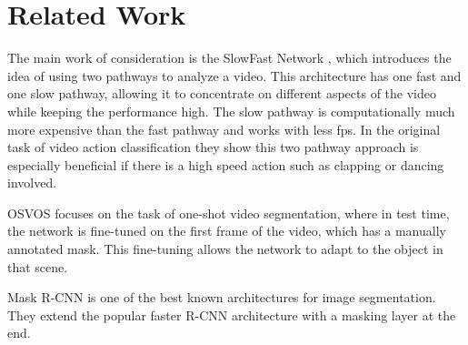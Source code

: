 \section{Related Work}
The main work of consideration is the SlowFast Network \cite{slow_fast}, which introduces the idea of using two pathways to analyze a video. This architecture has one fast and one slow pathway, allowing it to concentrate on different aspects of the video while keeping the performance high. The slow pathway is computationally much more expensive than the fast pathway and works with less fps. In the original task of video action classification they show this two pathway approach is especially beneficial if there is a high speed action such as clapping or dancing involved.

OSVOS \cite{osvos} focuses on the task of one-shot video segmentation, where in test time, the network is fine-tuned on the first frame of the video, which has a manually annotated mask. This fine-tuning allows the network to adapt to the object in that scene.

Mask R-CNN \cite{mask_rcnn} is one of the best known architectures for image segmentation. They extend the popular faster R-CNN architecture with a masking layer at the end.